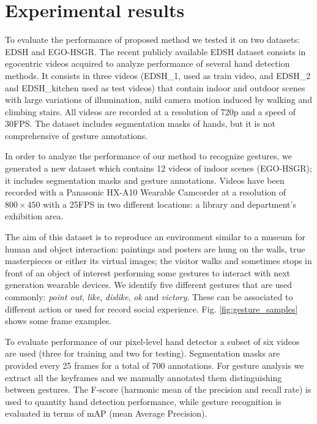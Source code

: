 \section{Experimental results}
To evaluate the performance of proposed method we tested it on two datasets: EDSH and EGO-HSGR.
The recent publicly available EDSH dataset \cite{li13} consists in egocentric videos acquired to analyze performance of several hand detection methods. It consists in three videos (EDSH\_1, used as train video, and EDSH\_2 and EDSH\_{kitchen} used as test videos) that contain indoor and outdoor scenes with large variations of illumination, mild camera motion induced by walking and climbing stairs. All videos are recorded at a resolution of 720p and a speed of 30FPS. The dataset includes segmentation masks of hands, but it is not comprehensive of gesture annotations.     


In order to analyze the performance of our method to recognize gestures, we generated a new dataset which contains 12 videos of indoor scenes (EGO-HSGR); it includes segmentation masks and gesture annotations. Videos have been recorded with a Panasonic HX-A10 Wearable Camcorder at a resolution of $800 \times 450$ with a 25FPS in two different locations: a library and department's exhibition area.   

The aim of this dataset is to reproduce an environment similar to a museum for human and object interaction: paintings and posters are hung on the walls, true masterpieces or either its virtual images; the visitor walks and sometimes stops in front of an object of interest performing some gestures to interact with next generation wearable devices. We identify five different gestures that are used commonly: \textit{point out}, \textit{like}, \textit{dislike}, \textit{ok} and \textit{victory}. These can be associated to different action or used for record social experience. Fig. \ref{fig:gesture_samples} shows some frame examples. 

To evaluate performance of our pixel-level hand detector a subset of six videos are used (three for training and two for testing). Segmentation masks are provided every 25 frames for a total of 700 annotations. For gesture analysis we extract all the keyframes and we manually annotated them distinguishing between gestures.  
The F-score (harmonic mean of the precision and recall rate) is used to quantity hand detection performance, while gesture recognition is evaluated in terms of mAP (mean Average Precision).
    

